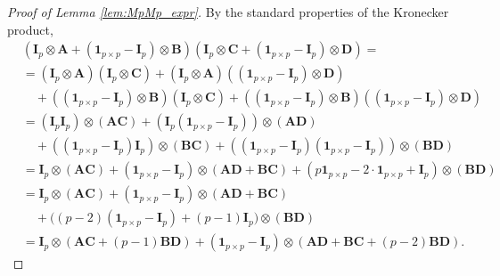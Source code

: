 \documentclass[12pt]{article}
\theoremstyle{plain}
\theoremstyle{remark}
\newcommand{\round}[1]{\left( #1 \right)}
\newcommand{\onepp}[0]{{\mathbf{1}_{p\times p}}}
\newcommand{\latMatr}[1]{\mathbf{#1}}          %
\begin{document}
    \begin{proof}[Proof of Lemma \ref{lem:MpMp_expr}]
        By the standard properties of the Kronecker product,
        \begin{align*}
            &\round{\latMatr{I}_p \otimes {\latMatr{A}} + (\onepp - \latMatr{I}_p) \otimes {\latMatr{B}}}\round{\latMatr{I}_p \otimes {\latMatr{C}} + (\onepp - \latMatr{I}_p) \otimes {\latMatr{D}}} = \\
            & = (\latMatr{I}_p \otimes {\latMatr{A}}) (\latMatr{I}_p \otimes {\latMatr{C}}) + (\latMatr{I}_p \otimes {\latMatr{A}}) \round{(\onepp - \latMatr{I}_p) \otimes {\latMatr{D}}} \\
            &\quad  + \round{(\onepp-\latMatr{I}_p) \otimes {\latMatr{B}}} \round{\latMatr{I}_p \otimes {\latMatr{C}}} + \round{(\onepp-\latMatr{I}_p) \otimes {\latMatr{B}}} \round{(\onepp - \latMatr{I}_p) \otimes {\latMatr{D}}} \\
            &= (\latMatr{I}_p \latMatr{I}_p) \otimes ({\latMatr{A}}{\latMatr{C}}) + (\latMatr{I}_p(\onepp-\latMatr{I}_p))\otimes ({\latMatr{A}}{\latMatr{D}}) \\
            &\quad  + ((\onepp-\latMatr{I}_p) \latMatr{I}_p) \otimes ({\latMatr{B}}{\latMatr{C}}) + ((\onepp-\latMatr{I}_p)(\onepp-\latMatr{I}_p)) \otimes ({\latMatr{B}}{\latMatr{D}})\\
            &= \latMatr{I}_p \otimes ({\latMatr{A}}{\latMatr{C}})+(\onepp-\latMatr{I}_p) \otimes ({\latMatr{A}}{\latMatr{D}}+{\latMatr{B}}{\latMatr{C}}) + (p \onepp - 2\cdot \onepp+\latMatr{I}_p)\otimes ({\latMatr{B}}{\latMatr{D}})\\
            &=\latMatr{I}_p \otimes ({\latMatr{A}}{\latMatr{C}}) + (\onepp-\latMatr{I}_p) \otimes ({\latMatr{A}}{\latMatr{D}}+{\latMatr{B}}{\latMatr{C}})\\
            &\quad  + \big((p-2)(\onepp-\latMatr{I}_p) + (p-1) \latMatr{I}_p\big) \otimes ({\latMatr{B}}{\latMatr{D}}) \\
            &= \latMatr{I}_p \otimes ({\latMatr{A}}{\latMatr{C}} + (p-1){\latMatr{B}}{\latMatr{D}}) + (\onepp-\latMatr{I}_p) \otimes ({\latMatr{A}}{\latMatr{D}}+{\latMatr{B}}{\latMatr{C}}+(p-2){\latMatr{B}}{\latMatr{D}}).
        \end{align*}
    \end{proof}
    
\end{document}
